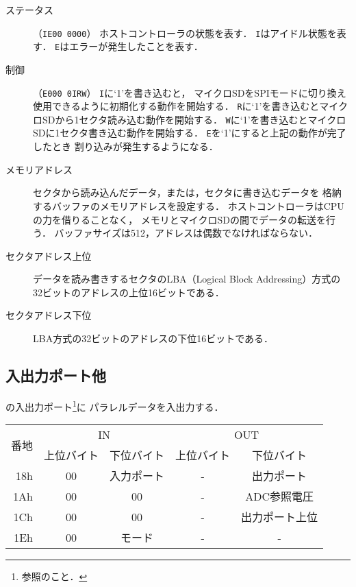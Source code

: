 \begin{description}
\item[ステータス]（\texttt{IE00 0000}）
  ホストコントローラの状態を表す．
  \texttt{I}はアイドル状態を表す．
  \texttt{E}はエラーが発生したことを表す．
\item[制御]（\texttt{E000 0IRW}）
  \texttt{I}に`1'を書き込むと，
  マイクロSDをSPIモードに切り換え使用できるように初期化する動作を開始する．
  \texttt{R}に`1'を書き込むとマイクロSDから1セクタ読み込む動作を開始する．
  \texttt{W}に`1'を書き込むとマイクロSDに1セクタ書き込む動作を開始する．
  \texttt{E}を`1'にすると上記の動作が完了したとき
  割り込みが発生するようになる．
\item[メモリアドレス]
  セクタから読み込んだデータ，または，セクタに書き込むデータを
  格納するバッファのメモリアドレスを設定する．
  ホストコントローラはCPUの力を借りることなく，
  メモリとマイクロSDの間でデータの転送を行う．
  バッファサイズは512，アドレスは偶数でなければならない．
\item[セクタアドレス上位]
  データを読み書きするセクタのLBA（Logical Block Addressing）方式の
  32ビットのアドレスの上位16ビットである．
\item[セクタアドレス下位]
  LBA方式の32ビットのアドレスの下位16ビットである．
\end{description}

\subsection{入出力ポート他}
{\tecS}の入出力ポート\footnote{参照のこと．}に
パラレルデータを入出力する．

\begin{center}
  \small\begin{tabular}{| r | c | c || c | c |}\hline
    \multirow{2}{*}{番地}
    & \multicolumn{2}{|c||}{IN}
    & \multicolumn{2}{c|}{OUT}
    \\\cline{2-5}
         & 上位バイト & 下位バイト & 上位バイト & 下位バイト
    \\\hline\hline
    18h  &  00 & 入力ポート
         &  -  & 出力ポート \\\hline
    1Ah  &  00 & 00
         &  -  & ADC参照電圧 \\\hline
    1Ch  &  00 & 00
         &  -  & 出力ポート上位 \\\hline
    1Eh  &  00 & モード
         &  - & - \\\hline
  \end{tabular}
\end{center}

